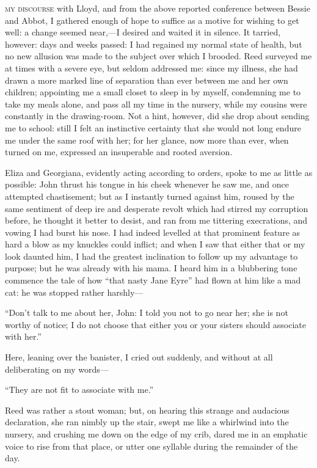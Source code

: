 
 \textsc{my discourse} with \Mr{} Lloyd, and from the above reported conference
between Bessie and Abbot, I gathered enough of hope to suffice as a
motive for wishing to get well: a change seemed near,---I desired and
waited it in silence. It tarried, however: days and weeks passed: I had
regained my normal state of health, but no new allusion was made to the
subject over which I brooded. \Mrs{} Reed surveyed me at times with a
severe eye, but seldom addressed me: since my illness, she had drawn a
more marked line of separation than ever between me and her own
children; appointing me a small closet to sleep in by myself, condemning
me to take my meals alone, and pass all my time in the nursery, while my
cousins were constantly in the drawing-room. Not a hint, however, did
she drop about sending me to school: still I felt an instinctive
certainty that she would not long endure me under the same roof with
her; for her glance, now more than ever, when turned on me, expressed an
insuperable and rooted aversion.

Eliza and Georgiana, evidently acting according to orders, spoke to me
as little as possible: John thrust his tongue in his cheek whenever he
saw me, and once attempted chastisement; but as I instantly turned
against him, roused by the same sentiment of deep ire and desperate
revolt which had stirred my corruption before, he thought it better to
desist, and ran from me tittering execrations, and vowing I had burst
his nose. I had indeed levelled at that prominent feature as hard a
blow as my knuckles could inflict; and when I saw that either that or my
look daunted him, I had the greatest inclination to follow up my
advantage to purpose; but he was already with his mama. I heard him in
a blubbering tone commence the tale of how \enquote{that nasty Jane
	Eyre} had flown at him like a mad cat: he was stopped rather harshly---

\enquote{Don't talk to me about her, John: I told you not to go near
	her; she is not worthy of notice; I do not choose that either you or
	your sisters should associate with her.}

Here, leaning over the banister, I cried out suddenly, and without at
all deliberating on my words---

\enquote{They are not fit to associate with me.}

\Mrs{} Reed was rather a stout woman; but, on hearing this strange and
audacious declaration, she ran nimbly up the stair, swept me like a
whirlwind into the nursery, and crushing me down on the edge of my crib,
dared me in an emphatic voice to rise from that place, or utter one
syllable during the remainder of the day.

